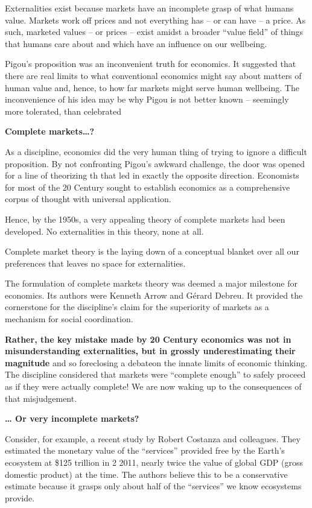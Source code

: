 \documentclass[
]{book}
\begin{document}
Externalities exist because markets have an incomplete grasp of what humans value. Markets
work off prices and not everything has -- or can have -- a price. As such, marketed values -- or
prices -- exist amidst a broader ``value field'' of things that humans care about and which have
an influence on our wellbeing.

Pigou's proposition was an inconvenient truth for economics. It suggested that there are real
limits to what conventional economics might say about matters of human value and, hence, to
how far markets might serve human wellbeing. The inconvenience of his idea may be why
Pigou is not better known -- seemingly more tolerated, than celebrated

\textbf{Complete markets\ldots?}

As a discipline, economics did the very human thing of trying to ignore a difficult proposition.
By not confronting Pigou's awkward challenge, the door was opened for a line of theorizing
th
that led in exactly the opposite direction. Economists for most of the 20 Century sought to
establish economics as a comprehensive corpus of thought with universal application.

Hence, by the 1950s, a very appealing theory of complete markets had been developed. No
externalities in this theory, none at all.

Complete market theory is the laying
down of a conceptual blanket over all our preferences that leaves no space for externalities.

The formulation of complete markets theory was deemed a major milestone for economics. Its authors were Kenneth Arrow and Gérard Debreu.
It provided the cornerstone for the discipline's claim for the
superiority of markets as a mechanism for social coordination.

\textbf{Rather, the key mistake made by 20 Century economics was not in misunderstanding
externalities, but in grossly underestimating their magnitude} and
so foreclosing a debateon the innate limits of economic thinking.
The discipline considered that markets were ``complete enough'' to
safely proceed as if they were actually complete!
We are now waking up to the consequences of that misjudgement.

\textbf{\ldots{} Or very incomplete markets?}

Consider, for example, a recent study by Robert Costanza and colleagues. They estimated
the monetary value of the ``services'' provided free by the Earth's ecosystem at \$125 trillion in
2
2011, nearly twice the value of global GDP (gross domestic product) at the time.
The authors believe this to be a conservative estimate because it grasps only about half of the ``services'' we know ecosystems provide.
\end{document}
